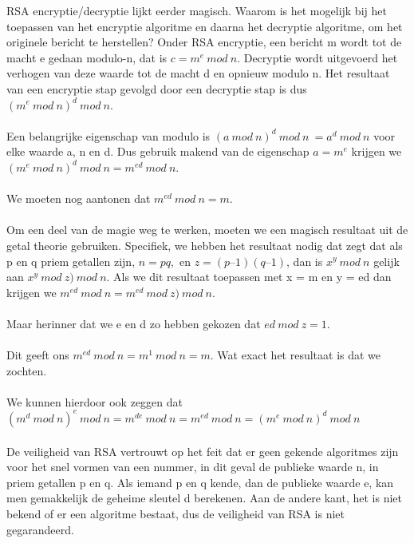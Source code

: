 \clearpage


RSA encryptie/decryptie lijkt eerder magisch. Waarom is het mogelijk bij het toepassen van het encryptie algoritme en daarna het decryptie algoritme, om het originele bericht te herstellen? 
Onder RSA encryptie, een bericht m wordt tot de macht e gedaan modulo-n, dat is $c = m^e\ mod\ n$.
Decryptie wordt uitgevoerd het verhogen van deze waarde tot de macht d en opnieuw modulo n. Het resultaat van een encryptie stap gevolgd door een decryptie stap is dus $(m^e\ mod\ n)^d\ mod\ n$.
\\\\
Een belangrijke eigenschap van modulo is $(a\ mod\ n)^d\ mod\ n\ = a^d\ mod\ n$ voor elke waarde a, n en d. Dus gebruik makend van de eigenschap $a = m^e$ krijgen we $(m^e\ mod\ n)^d\ mod\ n = m^{ed}\ mod\ n$.
\\\\
We moeten nog aantonen dat $m^{ed}\ mod\ n = m$. \\\\Om een deel van de magie weg te werken, moeten we een magisch resultaat uit de getal theorie gebruiken. Specifiek, we hebben het resultaat nodig dat zegt dat als p en q priem getallen zijn, $n = pq, $ en $ z = (p – 1)(q – 1)$, dan is $x^y\ mod\ n$ gelijk aan $x^{y}\ mod\ z) \ mod\ n$. Als we dit resultaat toepassen met x = m en y = ed dan krijgen we $m^{ed}\ mod\ n = m^{ed}\ mod\ z) \ mod\ n$.\\\\
Maar herinner dat we e en d zo hebben gekozen dat $ed\ mod\ z = 1$. \\\\Dit geeft ons $m^{ed}\ mod\ n = m^1\ mod\ n = m$.
Wat exact het resultaat is dat we zochten. \\\\We kunnen hierdoor ook zeggen dat $(m^d\ mod\ n)^e\ mod\ n = m^{de}\ mod\ n = m^{ed}\ mod\ n = (m^e\ mod\ n)^d\ mod\ n$
\\\\
De veiligheid van RSA vertrouwt op het feit dat er geen gekende algoritmes zijn voor het snel vormen van een nummer, in dit geval de publieke waarde n, in priem getallen p en q. Als iemand p en q kende, dan de publieke waarde e, kan men gemakkelijk de geheime sleutel d berekenen.
Aan de andere kant, het is niet bekend of er een algoritme bestaat, dus de veiligheid van RSA is niet gegarandeerd.
